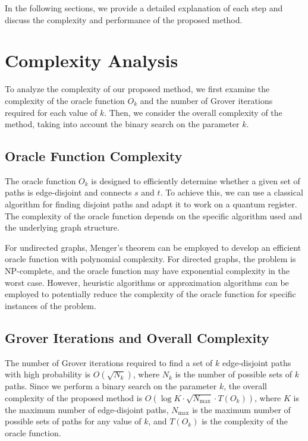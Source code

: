 In the following sections, we provide a detailed explanation of each step and discuss the complexity and performance of the proposed method.

\section{Complexity Analysis}
\label{sec:analysis}

To analyze the complexity of our proposed method, we first examine the complexity of the oracle function $O_k$ and the number of Grover iterations required for each value of $k$. Then, we consider the overall complexity of the method, taking into account the binary search on the parameter $k$.

\subsection{Oracle Function Complexity}

The oracle function $O_k$ is designed to efficiently determine whether a given set of paths is edge-disjoint and connects $s$ and $t$. To achieve this, we can use a classical algorithm for finding disjoint paths and adapt it to work on a quantum register. The complexity of the oracle function depends on the specific algorithm used and the underlying graph structure.

For undirected graphs, Menger's theorem can be employed to develop an efficient oracle function with polynomial complexity. For directed graphs, the problem is NP-complete, and the oracle function may have exponential complexity in the worst case. However, heuristic algorithms or approximation algorithms can be employed to potentially reduce the complexity of the oracle function for specific instances of the problem.

\subsection{Grover Iterations and Overall Complexity}

The number of Grover iterations required to find a set of $k$ edge-disjoint paths with high probability is $O(\sqrt{N_k})$, where $N_k$ is the number of possible sets of $k$ paths. Since we perform a binary search on the parameter $k$, the overall complexity of the proposed method is $O(\log K \cdot \sqrt{N_{\max}} \cdot T(O_k))$, where $K$ is the maximum number of edge-disjoint paths, $N_{\max}$ is the maximum number of possible sets of paths for any value of $k$, and $T(O_k)$ is the complexity of the oracle function.

